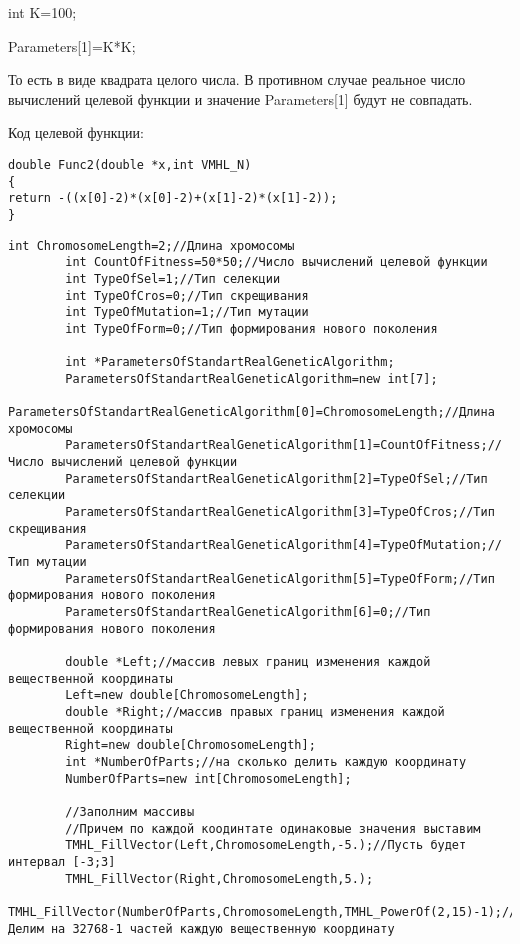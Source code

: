 \documentclass[a4paper,12pt]{article}
\begin{document}
int K=100;

Parameters[1]=K*K;

То есть в виде квадрата целого числа. В противном случае реальное число вычислений целевой функции и значение Parameters[1] будут не совпадать.

Код целевой функции:
\begin{lstlisting}[caption=Оптимизируемая функция]
double Func2(double *x,int VMHL_N)
{
return -((x[0]-2)*(x[0]-2)+(x[1]-2)*(x[1]-2));
}
\end{lstlisting}


\begin{lstlisting}[label=code_use_MHL_StandartRealGeneticAlgorithm,caption=Пример использования]
        int ChromosomeLength=2;//Длина хромосомы
        int CountOfFitness=50*50;//Число вычислений целевой функции
        int TypeOfSel=1;//Тип селекции
        int TypeOfCros=0;//Тип скрещивания
        int TypeOfMutation=1;//Тип мутации
        int TypeOfForm=0;//Тип формирования нового поколения

        int *ParametersOfStandartRealGeneticAlgorithm;
        ParametersOfStandartRealGeneticAlgorithm=new int[7];
        ParametersOfStandartRealGeneticAlgorithm[0]=ChromosomeLength;//Длина хромосомы
        ParametersOfStandartRealGeneticAlgorithm[1]=CountOfFitness;//Число вычислений целевой функции
        ParametersOfStandartRealGeneticAlgorithm[2]=TypeOfSel;//Тип селекции
        ParametersOfStandartRealGeneticAlgorithm[3]=TypeOfCros;//Тип скрещивания
        ParametersOfStandartRealGeneticAlgorithm[4]=TypeOfMutation;//Тип мутации
        ParametersOfStandartRealGeneticAlgorithm[5]=TypeOfForm;//Тип формирования нового поколения
        ParametersOfStandartRealGeneticAlgorithm[6]=0;//Тип формирования нового поколения

        double *Left;//массив левых границ изменения каждой вещественной координаты
        Left=new double[ChromosomeLength];
        double *Right;//массив правых границ изменения каждой вещественной координаты
        Right=new double[ChromosomeLength];
        int *NumberOfParts;//на сколько делить каждую координату
        NumberOfParts=new int[ChromosomeLength];

        //Заполним массивы
        //Причем по каждой коодинтате одинаковые значения выставим
        TMHL_FillVector(Left,ChromosomeLength,-5.);//Пусть будет интервал [-3;3]
        TMHL_FillVector(Right,ChromosomeLength,5.);
        TMHL_FillVector(NumberOfParts,ChromosomeLength,TMHL_PowerOf(2,15)-1);//Делим на 32768-1 частей каждую вещественную координату


\end{lstlisting}
\end{document}
